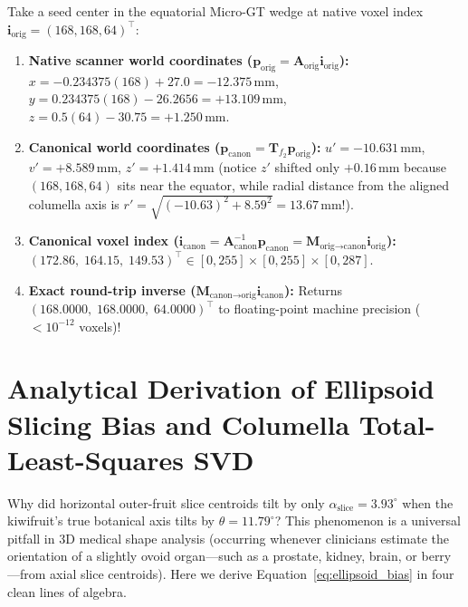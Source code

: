 \documentclass[10pt,a4paper]{article}
\renewcommand{\_}{\origunderscore\allowbreak}
\begin{document}
\begin{tcolorbox}[enhanced, colback=lightgray, colframe=uibblue!75, arc=2pt, left=7pt, right=7pt, top=5pt, bottom=5pt,
  title={\textbf{Worked Numerical Example: Tracing One Micro-GT Seed Center Through $f$ and Back Through $f^{-1}$}}]
Take a seed center in the equatorial Micro-GT wedge at native voxel index $\mathbf{i}_{\text{orig}} = (168, 168, 64)^\top$:
\begin{enumerate}[itemsep=1.2pt, topsep=2pt]
    \item \textbf{Native scanner world coordinates ($\mathbf{p}_{\text{orig}} = \mathbf{A}_{\text{orig}}\mathbf{i}_{\text{orig}}$):}
    $x = -0.234375(168) + 27.0 = -12.375\,\text{mm}$, $y = 0.234375(168) - 26.2656 = +13.109\,\text{mm}$, $z = 0.5(64) - 30.75 = +1.250\,\text{mm}$.
    \item \textbf{Canonical world coordinates ($\mathbf{p}_{\text{canon}} = \mathbf{T}_{f_2}\mathbf{p}_{\text{orig}}$):}
    $u' = -10.631\,\text{mm}$, $v' = +8.589\,\text{mm}$, $z' = +1.414\,\text{mm}$ (notice $z'$ shifted only $+0.16\,\text{mm}$ because $(168,168,64)$ sits near the equator, while radial distance from the aligned columella axis is $r' = \sqrt{(-10.63)^2 + 8.59^2} = 13.67\,\text{mm}$!).
    \item \textbf{Canonical voxel index ($\mathbf{i}_{\text{canon}} = \mathbf{A}_{\text{canon}}^{-1}\mathbf{p}_{\text{canon}} = \mathbf{M}_{\text{orig}\to\text{canon}}\mathbf{i}_{\text{orig}}$):}
    $(172.86,\; 164.15,\; 149.53)^\top \in [0, 255]\times[0, 255]\times[0, 287]$.
    \item \textbf{Exact round-trip inverse ($\mathbf{M}_{\text{canon}\to\text{orig}}\mathbf{i}_{\text{canon}}$):}
    Returns $(168.0000,\; 168.0000,\; 64.0000)^\top$ to floating-point machine precision ($<10^{-12}$ voxels)!
\end{enumerate}
\end{tcolorbox}

\clearpage
\section[Ellipsoid Slicing Bias \& Columella SVD]{Analytical Derivation of Ellipsoid Slicing Bias and Columella Total-Least-Squares SVD}
\label{app:ellipsoid}

Why did horizontal outer-fruit slice centroids tilt by only $\alpha_{\text{slice}} = 3.93^\circ$ when the kiwifruit's true botanical axis tilts by $\theta = 11.79^\circ$? This phenomenon is a universal pitfall in 3D medical shape analysis (occurring whenever clinicians estimate the orientation of a slightly ovoid organ---such as a prostate, kidney, brain, or berry---from axial slice centroids). Here we derive Equation~\eqref{eq:ellipsoid_bias} in four clean lines of algebra.
\end{document}

